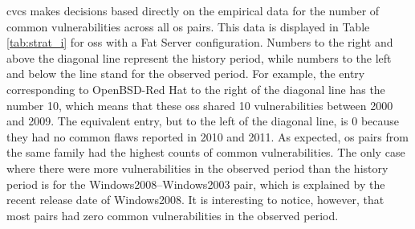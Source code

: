 \gls{cvcs} makes decisions based directly on the empirical data for the  number of common vulnerabilities across all \gls{os} pairs. 
This data is displayed in Table \ref{tab:strat_i} for \glspl{os} with a Fat Server configuration. 
Numbers to the right and above the diagonal line represent the history period, while numbers to the left and below the line stand for the observed period. 
For example, the entry corresponding to OpenBSD-Red Hat to the right of the diagonal line has the number 10, which means that these \glspl{os} shared 10 vulnerabilities between 2000 and 2009. 
The equivalent entry, but to the left of the diagonal line, is 0 because they had no common flaws reported in 2010 and 2011. 
As expected, \gls{os} pairs from the same family had the highest counts of common vulnerabilities. 
The only case where there were more vulnerabilities in the observed period than the history period is for the Windows2008--Windows2003 pair, which is explained by the recent release date of Windows2008. 
It is interesting to notice, however, that most pairs had zero common vulnerabilities in the observed period.


